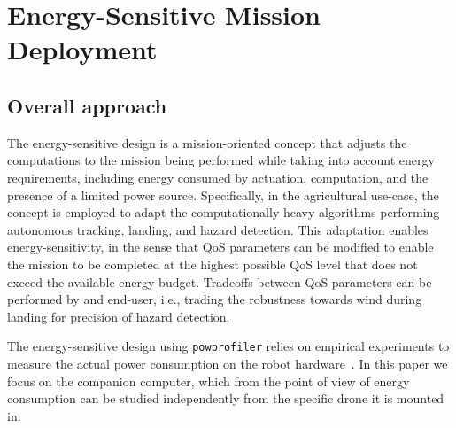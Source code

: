 \documentclass[conference]{IEEEtran}
\newcommand{\stt}[1]{{\small\tt #1}} %
\newcommand{\powprof}{\stt{powprofiler}}
\begin{document}
\section{Energy-Sensitive Mission Deployment} 
\label{sec:approach}

\subsection{Overall approach}

The energy-sensitive design is a mission-oriented concept that adjusts the computations to the mission being performed while taking into account energy requirements, including energy consumed by actuation, computation, and the presence of a limited power source. Specifically, in the agricultural use-case, the concept is employed to adapt the computationally heavy algorithms performing autonomous tracking, landing, and hazard detection. This adaptation enables energy-sensitivity, in the sense that QoS parameters can be modified to enable the mission to be completed at the highest possible QoS level that does not exceed the available energy budget. Tradeoffs between QoS parameters can be performed by and end-user, i.e., trading the robustness towards wind during landing for precision of hazard detection.

The energy-sensitive design using \powprof{} relies on empirical experiments to measure the actual power consumption on the robot hardware~\cite{seewald2019coarse}. In this paper we focus on the companion computer, which from the point of view of energy consumption can be studied independently from the specific drone it is mounted in.
\end{document}
